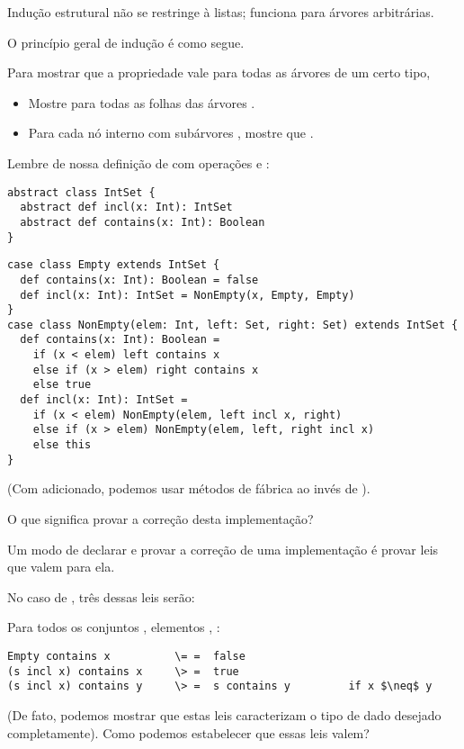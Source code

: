 {Indução estrutural não se restringe à listas; funciona para árvores arbitrárias.

O princípio geral de indução é como segue.

Para mostrar que a propriedade  vale para todas as árvores de um certo tipo,
\begin{itemize}
\item Mostre  para todas as folhas das árvores .
\item Para cada nó interno  com subárvores ,
      mostre que  . 
\end{itemize} 

\example Lembre de nossa definição de  com operações  e :

\begin{lstlisting}
abstract class IntSet {
  abstract def incl(x: Int): IntSet
  abstract def contains(x: Int): Boolean
}
\end{lstlisting}
\es\bs
\begin{lstlisting}
case class Empty extends IntSet {
  def contains(x: Int): Boolean = false
  def incl(x: Int): IntSet = NonEmpty(x, Empty, Empty)
}
case class NonEmpty(elem: Int, left: Set, right: Set) extends IntSet {
  def contains(x: Int): Boolean =
    if (x < elem) left contains x
    else if (x > elem) right contains x
    else true
  def incl(x: Int): IntSet =
    if (x < elem) NonEmpty(elem, left incl x, right)
    else if (x > elem) NonEmpty(elem, left, right incl x)
    else this
}
\end{lstlisting}
(Com  adicionado, podemos usar métodos de fábrica ao invés de ).

O que significa provar a correção desta implementação?
\es
{}

Um modo de declarar e provar a correção de uma implementação é provar leis que valem para ela.


No caso de , três dessas leis serão:


Para todos os conjuntos , elementos , :
\begin{lstlisting}
Empty contains x          \= =  false
(s incl x) contains x     \> =  true
(s incl x) contains y     \> =  s contains y         if x $\neq$ y
\end{lstlisting}

(De fato, podemos mostrar que estas leis caracterizam o tipo de dado desejado completamente).
Como podemos estabelecer que essas leis valem?

}
